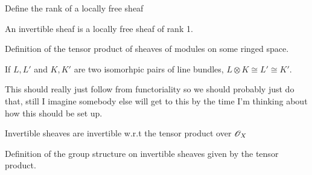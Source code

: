 \begin{definition}
  \label{def:locallyfreerank}
  Define the rank of a locally free sheaf
\end{definition}

\begin{definition}
  \label{def:invertiblesheaf}
  An invertible sheaf is a locally free sheaf of rank 1.
\end{definition}

\begin{definition}
  \label{def:sheaftensorproduct}
  Definition of the tensor product of sheaves of modules on some ringed space.
\end{definition}

\begin{lemma}
  \label{lem:tensorpreservesiso}
  If $L, L'$ and $K, K'$ are two isomorhpic pairs of line bundles, $L \otimes K \cong L' \cong K'$. 

  This should really just follow from functoriality so we should probably just do that,
  still I imagine somebody else will get to this by the time I'm thinking about how this
  should be set up.
\end{lemma}

\begin{lemma}
  \label{lem:invertiblesheavesinvertible}
  Invertible sheaves are invertible w.r.t the tensor product over $\mathscr{O}_X$
\end{lemma}

\begin{definition}
  \label{def:picardgroup}
  Definition of the group structure on invertible sheaves given by the tensor product.
\end{definition}


\begin{definition}
  \label{def:sheafoftotalquotientrings}
\end{definition}

\begin{definition}
  \label{def:rationalsection}
\end{definition}

\begin{definition}
  \label{def:divisorofrationalsection}
\end{definition}



